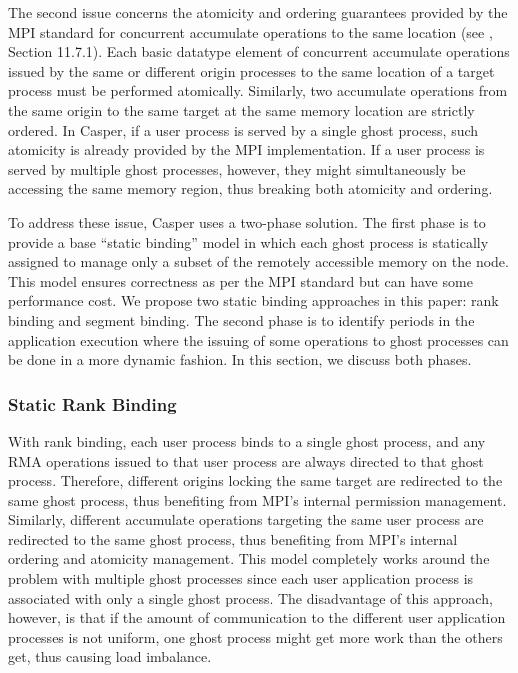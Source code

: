 The second issue concerns the atomicity and ordering
guarantees provided by the MPI standard for concurrent accumulate
operations to the same location (see \cite{mpi30-report}, Section
11.7.1).  Each basic datatype element of concurrent accumulate
operations issued by the same or different origin processes to the
same location of a target process must be performed atomically.
Similarly, two accumulate operations from the same origin to the same
target at the same memory location are strictly ordered.  In Casper,
if a user process is served by a single ghost process, such atomicity
is already provided by the MPI implementation.  If a user
process is served by multiple ghost processes, however, they might
simultaneously be accessing the same memory region, thus breaking both
atomicity and ordering.

To address these issue, Casper uses a two-phase solution.  The first
phase is to provide a base ``static binding'' model in which each ghost
process is statically assigned to manage only a subset of the remotely
accessible memory on the node.  This model ensures correctness as per
the MPI standard but can have some performance cost.  We propose two
static binding approaches in this paper: rank binding and segment
binding.  The second phase is to identify periods in the application
execution where the issuing of some operations to ghost processes can
be done in a more dynamic fashion.  In this section, we discuss both
phases.

\subsubsection{Static Rank Binding}
With rank binding, each user process
binds to a single ghost process, and any RMA operations issued to that
user process are always directed to that ghost process.  Therefore,
different origins locking the same target are redirected to the
same ghost process, thus benefiting from MPI's internal permission
management.  Similarly, different accumulate operations targeting the
same user process are redirected to the same ghost process,
thus benefiting from MPI's internal ordering and atomicity management.
This model completely works around the problem with multiple ghost
processes since each user application process is associated with
only a single ghost process.  The disadvantage of this approach, however,
is that if the amount of communication to the different user
application processes is not uniform, one ghost process might get more
work than the others get, thus causing load imbalance.

